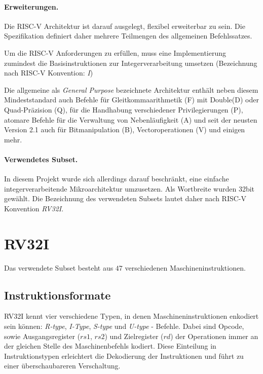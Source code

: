 \paragraph{Erweiterungen.} Die RISC-V Architektur ist darauf ausgelegt, flexibel erweiterbar zu sein. Die Spezifikation definiert daher mehrere Teilmengen des allgemeinen Befehlssatzes. \citep[p. 4]{RISC}

Um die RISC-V Anforderungen zu erfüllen, muss eine Implementierung zumindest die Basisinstruktionen zur Integerverarbeitung umsetzen (Bezeichnung nach \mbox{RISC-V} Konvention: \textit{I})

Die allgemeine als \textit{General Purpose} bezeichnete Architektur enthält neben diesem Mindeststandard auch Befehle für Gleitkommaarithmetik (F) mit Double(D) oder Quad-Präzision (Q), für die Handhabung verschiedener Privilegierungen (P), atomare Befehle für die Verwaltung von Nebenläufigkeit (A) und seit der neusten Version 2.1 auch für Bitmanipulation (B), Vectoroperationen (V) und einigen mehr.

\paragraph{Verwendetes Subset.} In diesem Projekt wurde sich allerdings darauf beschränkt, eine einfache integerverarbeitende Mikroarchitektur umzusetzen. Als Wortbreite wurden 32bit gewählt. Die Bezeichnung des verwendeten Subsets lautet daher nach RISC-V Konvention \textit{RV32I}.

\section{RV32I}
Das verwendete Subset besteht aus $47$ verschiedenen Maschineninstruktionen.

\subsection{Instruktionsformate}
RV32I kennt vier verschiedene Typen, in denen Maschineninstruktionen enkodiert sein können: \textit{R-type}, \textit{I-Type}, \textit{S-type} und \textit{U-type} - Befehle. Dabei sind Opcode, sowie Ausgangsregister ($rs1$, $rs2$) und Zielregister ($rd$) der Operationen immer an der gleichen Stelle des Maschinenbefehls kodiert. Diese Einteilung in Instruktionstypen erleichtert die Dekodierung der Instruktionen und führt zu einer überschaubareren Verschaltung.

